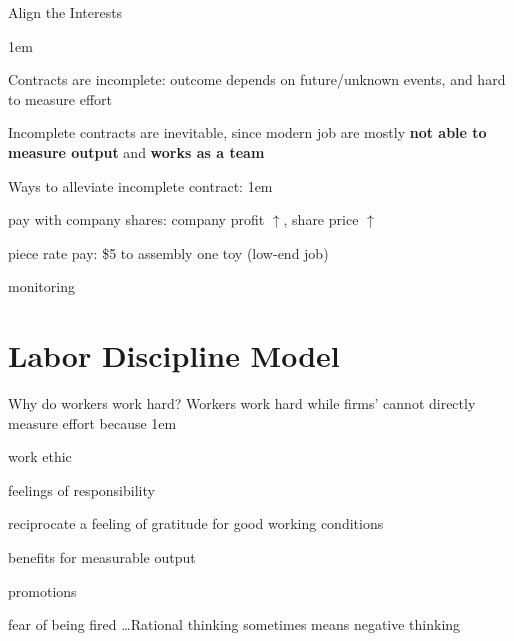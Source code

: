 \documentclass[11pt,aspectratio=43,usenames,dvipsnames]{beamer}
\let\olditemize=\itemize
\let\endolditemize=\enditemize
\renewenvironment{itemize}{\olditemize \itemsep1em}{\endolditemize}
\let\oldenumerate=\enumerate
\let\endoldenumerate=\endenumerate
\renewenvironment{enumerate}{\oldenumerate \itemsep1em}{ \endoldenumerate}
\theoremstyle{definition}
\begin{document}
\begin{frame}{Align the Interests}
\label{slide:Align_the_Interests}

    \begin{itemize}
        \item Contracts are \alert{incomplete}: outcome depends on \alert{future/unknown} events, and hard to \alert{measure} effort
        \item Incomplete contracts are inevitable, since modern job are mostly \textbf{not able to measure output} and \textbf{works as a team}
        \item Ways to alleviate incomplete contract:
        \begin{enumerate}
            \item pay with company shares: company profit $ \uparrow  $, share price $ \uparrow  $
            \item piece rate pay: \$5 to assembly one toy (low-end job)
            \item monitoring
        \end{enumerate}
    \end{itemize}
\end{frame}

\section[Labor]{Labor Discipline Model}
\label{sec:Labor_Discipline_Model}

\begin{frame}{Why do workers work hard?}
\label{slide:Why_do_workers_work_hard_}
    Workers work hard while firms' cannot directly measure effort because
    \begin{enumerate}
        \item work ethic
        \item feelings of responsibility
        \item reciprocate a feeling of gratitude for good working conditions
        \item benefits for measurable output
        \item promotions
        \item \alert{fear of being fired}
    \end{enumerate}
    \ldots Rational thinking sometimes means negative thinking \faMehO
\end{frame}
\end{document}
